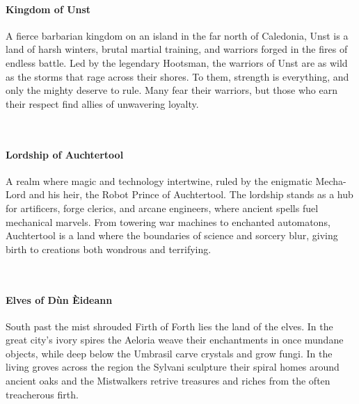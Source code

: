 {\entryfont\paragraph*{Kingdom of Unst} A fierce barbarian kingdom on an island in the far north of Caledonia, Unst is a land of harsh winters, brutal martial training, and warriors forged in the fires of endless battle. Led by the legendary Hootsman, the warriors of Unst are as wild as the storms that rage across their shores. To them, strength is everything, and only the mighty deserve to rule. Many fear their warriors, but those who earn their respect find allies of unwavering loyalty.}
\hfill\vspace*{-0.5\fontdimen6\font}\\
{\entryfont\paragraph*{Lordship of Auchtertool} A realm where magic and technology intertwine, ruled by the enigmatic Mecha-Lord and his heir, the Robot Prince of Auchtertool. The lordship stands as a hub for artificers, forge clerics, and arcane engineers, where ancient spells fuel mechanical marvels. From towering war machines to enchanted automatons, Auchtertool is a land where the boundaries of science and sorcery blur, giving birth to creations both wondrous and terrifying.}
\hfill\vspace*{-0.5\fontdimen6\font}\\
{\entryfont\paragraph*{Elves of Dùn Èideann} South past the mist shrouded Firth of Forth lies the land of the elves. In the great city's ivory spires the Aeloria weave their enchantments in once mundane objects, while deep below the Umbrasil carve crystals and grow fungi. In the living groves across the region the Sylvani sculpture their spiral homes around ancient oaks and the Mistwalkers retrive treasures and riches from the often treacherous firth.}